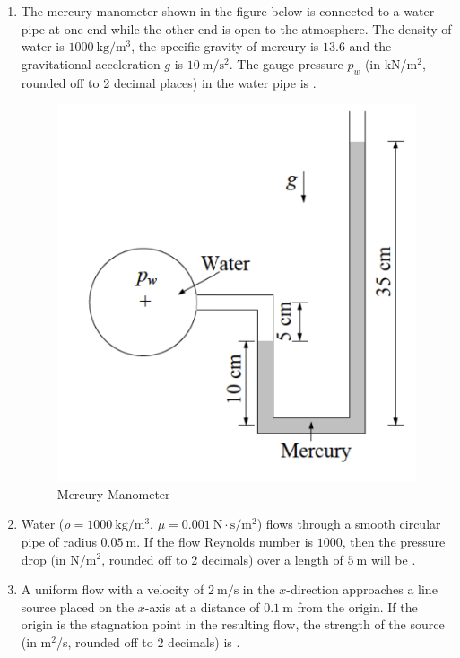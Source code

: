 \documentclass[journal,12pt,onecolumn]{IEEEtran}
\begin{document}
\begin{enumerate}[label=\arabic*)]
\vspace{0.5cm}

\item The mercury manometer shown in the figure below is connected to a water pipe at one end while the other end is open to the atmosphere. The density of water is $1000\ \mathrm{kg/m^3}$, the specific gravity of mercury is $13.6$ and the gravitational acceleration $g$ is $10\ \mathrm{m/s^2}$. The gauge pressure $p_w$ (in kN/m$^2$, rounded off to 2 decimal places) in the water pipe is \underline{\hspace{2cm}}.

\begin{figure}[htbp]
  \centering
  \includegraphics[width=.4\linewidth]{figs/B/fig3.png}
  \caption{Mercury Manometer}
  \label{B/fig3}
\end{figure}

\vspace{0.5cm}

\item Water ($\rho=1000\ \mathrm{kg/m^3}$, $\mu=0.001\ \mathrm{N\cdot s/m^2}$) flows through a smooth circular pipe of radius $0.05\ \mathrm{m}$. If the flow Reynolds number is $1000$, then the pressure drop (in N/m$^2$, rounded off to 2 decimals) over a length of $5\ \mathrm{m}$ will be \underline{\hspace{2cm}}.
\hfill{} \\

\vspace{0.5cm}

\item A uniform flow with a velocity of $2\ \mathrm{m/s}$ in the $x$-direction approaches a line source placed on the $x$-axis at a distance of $0.1\ \mathrm{m}$ from the origin. If the origin is the stagnation point in the resulting flow, the strength of the source (in m$^2$/s, rounded off to 2 decimals) is \underline{\hspace{2cm}}.
\hfill{} \\


\end{enumerate}
\end{document}
